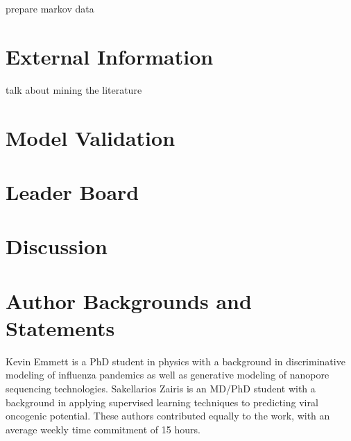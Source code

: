 \documentclass[letterpaper, 11pt]{article}
\begin{document}
prepare markov data

\section{External Information}

talk about mining the literature

\section{Model Validation}


\section{Leader Board}


\section{Discussion}


\section{Author Backgrounds and Statements}

Kevin Emmett is a PhD student in physics with a background in discriminative modeling of influenza pandemics as well as generative modeling of nanopore sequencing technologies.  Sakellarios Zairis is an MD/PhD student with a background in applying supervised learning techniques to predicting viral oncogenic potential.  These authors contributed equally to the work, with an average weekly time commitment of 15 hours.


\end{document}
